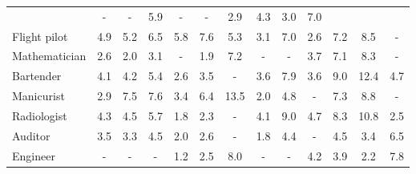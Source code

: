 \begin{table*}[p]
{\begin{tabular}{l|ccc|ccc|ccc|ccc}
& \cellcolor{lightgray} - & \cellcolor{lightgray} - & \cellcolor{blue2} 5.9
& \cellcolor{lightgray} - & \cellcolor{lightgray} - & \cellcolor{blue1} 2.9
& \cellcolor{orange2} 4.3 & \cellcolor{orange1} 3.0 & \cellcolor{blue3} 7.0
\\
Flight pilot
& \cellcolor{orange2} 4.9 & \cellcolor{orange2} 5.2 & \cellcolor{orange2} 6.5
& \cellcolor{orange2} 5.8 & \cellcolor{orange3} 7.6 & \cellcolor{orange2} 5.3
& \cellcolor{orange1} 3.1 & \cellcolor{orange3} 7.0 & \cellcolor{orange1} 2.6
& \cellcolor{orange3} 7.2 & \cellcolor{orange3} 8.5 & \cellcolor{lightgray} -
\\
Mathematician
& \cellcolor{orange1} 2.6 & \cellcolor{orange1} 2.0 & \cellcolor{orange1} 3.1
& \cellcolor{lightgray} - & \cellcolor{blue1} 1.9 & \cellcolor{blue3} 7.2
& \cellcolor{lightgray} - & \cellcolor{lightgray} - & \cellcolor{blue1} 3.7
& \cellcolor{orange3} 7.1 & \cellcolor{orange3} 8.3 & \cellcolor{lightgray} -
\\
Bartender
& \cellcolor{orange2} 4.1 & \cellcolor{orange2} 4.2 & \cellcolor{orange2} 5.4
& \cellcolor{orange1} 2.6 & \cellcolor{orange1} 3.5 & \cellcolor{lightgray} -
& \cellcolor{orange1} 3.6 & \cellcolor{orange3} 7.9 & \cellcolor{orange1} 3.6
& \cellcolor{orange3} 9.0 & \cellcolor{orange5} 12.4 & \cellcolor{orange2} 4.7
\\
Manicurist
& \cellcolor{blue1} 2.9 & \cellcolor{blue3} 7.5 & \cellcolor{blue3} 7.6
& \cellcolor{blue1} 3.4 & \cellcolor{blue2} 6.4 & \cellcolor{blue5} 13.5
& \cellcolor{orange1} 2.0 & \cellcolor{orange2} 4.8 & \cellcolor{lightgray} -
& \cellcolor{orange3} 7.3 & \cellcolor{orange3} 8.8 & \cellcolor{lightgray} -
\\
Radiologist
& \cellcolor{orange2} 4.3 & \cellcolor{orange2} 4.5 & \cellcolor{orange2} 5.7
& \cellcolor{orange1} 1.8 & \cellcolor{orange1} 2.3 & \cellcolor{lightgray} -
& \cellcolor{orange2} 4.1 & \cellcolor{orange3} 9.0 & \cellcolor{orange2} 4.7
& \cellcolor{orange3} 8.3 & \cellcolor{orange4} 10.8 & \cellcolor{orange1} 2.5
\\
Auditor
& \cellcolor{orange1} 3.5 & \cellcolor{orange1} 3.3 & \cellcolor{orange2} 4.5
& \cellcolor{orange1} 2.0 & \cellcolor{orange1} 2.6 & \cellcolor{lightgray} -
& \cellcolor{orange1} 1.8 & \cellcolor{orange2} 4.4 & \cellcolor{lightgray} -
& \cellcolor{orange2} 4.5 & \cellcolor{orange1} 3.4 & \cellcolor{blue2} 6.5
\\
Engineer
& \cellcolor{lightgray} - & \cellcolor{lightgray} - & \cellcolor{lightgray} -
& \cellcolor{blue1} 1.2 & \cellcolor{blue1} 2.5 & \cellcolor{blue3} 8.0
& \cellcolor{lightgray} - & \cellcolor{lightgray} - & \cellcolor{blue2} 4.2
& \cellcolor{orange2} 3.9 & \cellcolor{orange1} 2.2 & \cellcolor{blue3} 7.8
\\

\bottomrule
\end{tabular}
}
\label{appendix:stat-results-par1}
\end{table*}